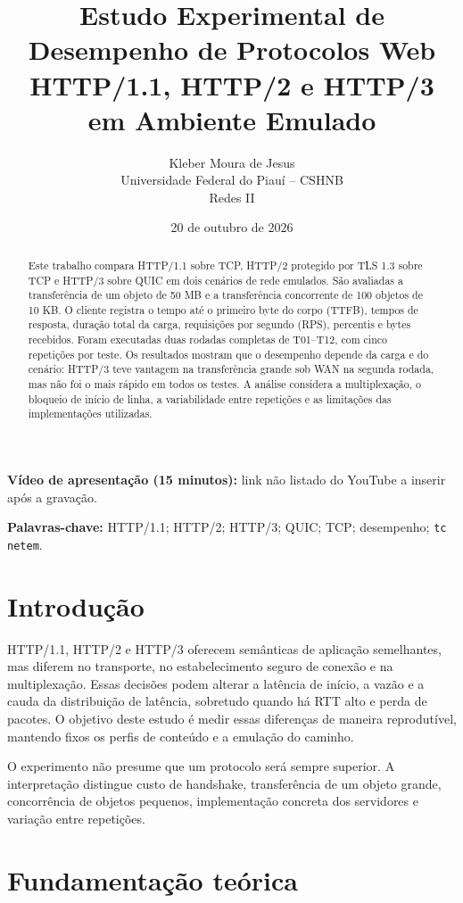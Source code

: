 \documentclass[12pt,a4paper]{article}
\title{
  \textbf{Estudo Experimental de Desempenho de Protocolos Web}\\
  \large HTTP/1.1, HTTP/2 e HTTP/3 em Ambiente Emulado
}
\author{
  Kleber Moura de Jesus\\
  Universidade Federal do Piauí -- CSHNB\\
  Redes II
}
\date{20 de outubro de 2026}
\begin{document}
\maketitle

\begin{center}
\textbf{Vídeo de apresentação (15 minutos):} link não listado do YouTube a inserir após a gravação.
\end{center}

\begin{abstract}
Este trabalho compara HTTP/1.1 sobre TCP, HTTP/2 protegido por TLS 1.3 sobre TCP e HTTP/3
sobre QUIC em dois cenários de rede emulados. São avaliadas a transferência de um objeto de
50 MB e a transferência concorrente de 100 objetos de 10 KB. O cliente registra o tempo até
o primeiro byte do corpo (TTFB), tempos de resposta, duração total da carga, requisições por
segundo (RPS), percentis e bytes recebidos. Foram executadas duas rodadas completas de
T01--T12, com cinco repetições por teste. Os resultados mostram que o desempenho depende
da carga e do cenário: HTTP/3 teve vantagem na transferência grande sob WAN na segunda
rodada, mas não foi o mais rápido em todos os testes. A análise considera a multiplexação,
o bloqueio de início de linha, a variabilidade entre repetições e as limitações das
implementações utilizadas.
\end{abstract}

\noindent\textbf{Palavras-chave:} HTTP/1.1; HTTP/2; HTTP/3; QUIC; TCP; desempenho; \texttt{tc netem}.

\section{Introdução}

HTTP/1.1, HTTP/2 e HTTP/3 oferecem semânticas de aplicação semelhantes, mas diferem no
transporte, no estabelecimento seguro de conexão e na multiplexação. Essas decisões podem
alterar a latência de início, a vazão e a cauda da distribuição de latência, sobretudo quando
há RTT alto e perda de pacotes. O objetivo deste estudo é medir essas diferenças de maneira
reprodutível, mantendo fixos os perfis de conteúdo e a emulação do caminho.

O experimento não presume que um protocolo será sempre superior. A interpretação distingue
custo de handshake, transferência de um objeto grande, concorrência de objetos pequenos,
implementação concreta dos servidores e variação entre repetições.

\section{Fundamentação teórica}
\end{document}

